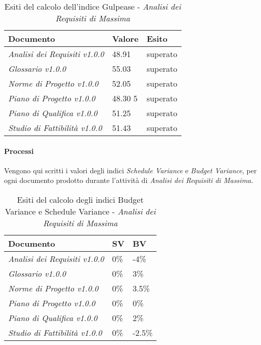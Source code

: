 	\begin{table}[H]
		\centering
		\begin{tabular}{|C{7cm}|C{2cm}|C{2cm}|}
			\hline
			\textbf{Documento} & \textbf{Valore} & \textbf{Esito}  \\
			\hline
			\textit{Analisi dei Requisiti v1.0.0} & 48.91 & superato \\
			\hline
			\textit{Glossario v1.0.0} & 55.03 & superato \\
			\hline
			\textit{Norme di Progetto v1.0.0} & 52.05 & superato \\
			\hline
			\textit{Piano di Progetto v1.0.0} & 48.30	5 & superato \\
			\hline
			\textit{Piano di Qualifica v1.0.0} & 51.25 & superato \\
			\hline
			\textit{Studio di Fattibilità v1.0.0} & 51.43 & superato \\
			\hline
			
		\end{tabular}
		\caption{Esiti del calcolo dell'indice Gulpease - \textit{Analisi dei Requisiti di Massima}}
	\end{table}
	\paragraph{Processi} \Spazio
	Vengono qui scritti i valori degli indici \textit{Schedule Variance} e \textit{Budget Variance}, per ogni documento prodotto durante l'attività di \textit{Analisi dei Requisiti di Massima.} 
	
	\begin{table}[H]
		\centering
		\begin{tabular}{|C{7cm}|C{2cm}|C{2cm}|}
			\hline
			\textbf{Documento} & \textbf{SV} & \textbf{BV}  \\
			\hline
			\textit{Analisi dei Requisiti v1.0.0} & 0\% & -4\%  \\
			\hline
			\textit{Glossario v1.0.0} & 0\% &  3\% \\
			\hline
			\textit{Norme di Progetto v1.0.0} & 0\% & 3.5\% \\
			\hline
			\textit{Piano di Progetto v1.0.0} & 0\% & 0\% \\
			\hline
			\textit{Piano di Qualifica v1.0.0} & 0\% & 2\% \\
			\hline
			\textit{Studio di Fattibilità v1.0.0} & 0\% & -2.5\%\\
			\hline
			
		\end{tabular}
		\caption{Esiti del calcolo degli indici Budget Variance e Schedule Variance - \textit{Analisi dei Requisiti di Massima}}
	\end{table}
     
